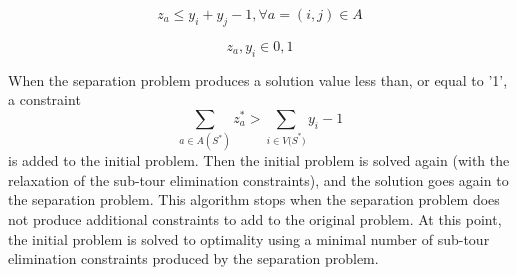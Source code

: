 \begin{equation}
z_a\le y_i+y_j-1, \forall a=\left(i,j\right)\in A
\end{equation}

\begin{equation}
z_a,y_i\in{0,1}
\end{equation}

When the separation problem produces a solution value less than, or equal to '1', a constraint 
\begin{equation}
\sum_{a\in A(S^\ast)}{z_a^\ast>\sum_{i\in{V(S}^\ast)}{y_i-1}}
\end{equation}
is added to the initial problem. Then the initial problem is solved again (with the relaxation of the sub-tour elimination constraints), and the solution goes again to the separation problem. This algorithm stops when the separation problem does not produce additional constraints to add to the original problem. At this point, the initial problem is solved to optimality using a minimal number of sub-tour elimination constraints produced by the separation problem.

